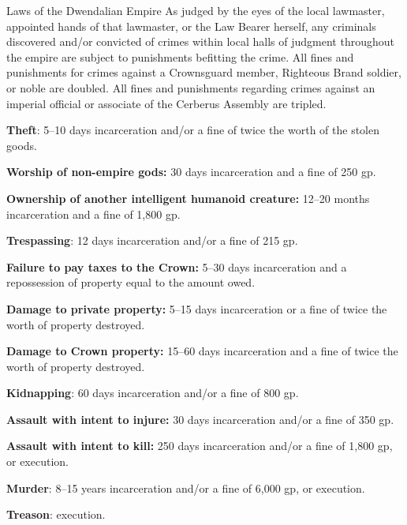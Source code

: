 \documentclass[10pt,a4paper,twoside,bg=print,twocolumn,openany,nodeprecatedcode]{dndbook}
\begin{document}
\begin{DndSidebar}[float=!b]{Laws of the Dwendalian Empire}
As judged by the eyes of the local lawmaster, appointed hands of that lawmaster, or the Law Bearer herself, any criminals discovered and/or convicted of crimes within local halls of judgment throughout the empire are subject to punishments befitting the crime. All fines and punishments for crimes against a Crownsguard member, Righteous Brand soldier, or noble are doubled. All fines and punishments regarding crimes against an imperial official or associate of the Cerberus Assembly are tripled.



\textbf{Theft}: 5–10 days incarceration and/or a fine of twice the worth of the stolen goods.



\textbf{Worship of non-empire gods:} 30 days incarceration and a fine of 250 gp.



\textbf{Ownership of another intelligent humanoid creature:} 12–20 months incarceration and a fine of 1,800 gp.



\textbf{Trespassing}: 12 days incarceration and/or a fine of 215 gp.



\textbf{Failure to pay taxes to the Crown:} 5–30 days incarceration and a repossession of property equal to the amount owed.



\textbf{Damage to private property:} 5–15 days incarceration or a fine of twice the worth of property destroyed.



\textbf{Damage to Crown property:} 15–60 days incarceration and a fine of twice the worth of property destroyed.



\textbf{Kidnapping}: 60 days incarceration and/or a fine of 800 gp.



\textbf{Assault with intent to injure:} 30 days incarceration and/or a fine of 350 gp.



\textbf{Assault with intent to kill:} 250 days incarceration and/or a fine of 1,800 gp, or execution.



\textbf{Murder}: 8–15 years incarceration and/or a fine of 6,000 gp, or execution.



\textbf{Treason}: execution.



\end{DndSidebar}
\end{document}
